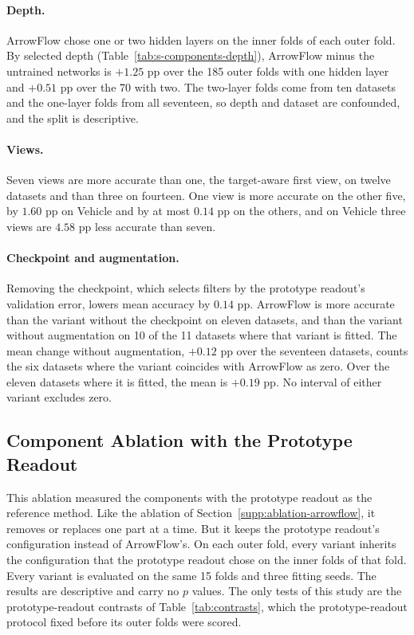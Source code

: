 \paragraph{Depth.} ArrowFlow chose one or two hidden layers on the inner folds of each outer fold. By selected depth (Table~\ref{tab:s-components-depth}), ArrowFlow minus the untrained networks is $+1.25$ pp over the 185 outer folds with one hidden layer and $+0.51$ pp over the 70 with two. The two-layer folds come from ten datasets and the one-layer folds from all seventeen, so depth and dataset are confounded, and the split is descriptive.

\paragraph{Views.} Seven views are more accurate than one, the target-aware first view, on twelve datasets and than three on fourteen. One view is more accurate on the other five, by $1.60$ pp on Vehicle and by at most $0.14$ pp on the others, and on Vehicle three views are $4.58$ pp less accurate than seven.

\paragraph{Checkpoint and augmentation.} Removing the checkpoint, which selects filters by the prototype readout's validation error, lowers mean accuracy by $0.14$ pp. ArrowFlow is more accurate than the variant without the checkpoint on eleven datasets, and than the variant without augmentation on 10 of the 11 datasets where that variant is fitted. The mean change without augmentation, $+0.12$ pp over the seventeen datasets, counts the six datasets where the variant coincides with ArrowFlow as zero. Over the eleven datasets where it is fitted, the mean is $+0.19$ pp. No interval of either variant excludes zero.

\FloatBarrier
\subsection{Component Ablation with the Prototype Readout}\label{supp:ablation-prototype}

This ablation measured the components with the prototype readout as the reference method. Like the ablation of Section~\ref{supp:ablation-arrowflow}, it removes or replaces one part at a time. But it keeps the prototype readout's configuration instead of ArrowFlow's. On each outer fold, every variant inherits the configuration that the prototype readout chose on the inner folds of that fold. Every variant is evaluated on the same 15 folds and three fitting seeds. The results are descriptive and carry no $p$ values. The only tests of this study are the prototype-readout contrasts of Table~\ref{tab:contrasts}, which the prototype-readout protocol fixed before its outer folds were scored.

